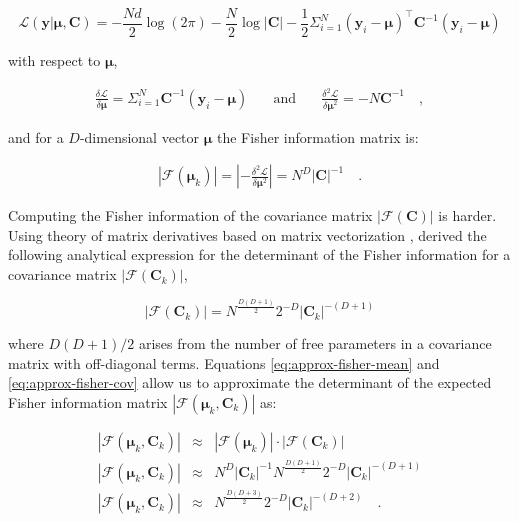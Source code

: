 \documentclass{aastex61}
\newcommand{\vect}[1]{\boldsymbol{\mathbf{#1}}}
\def\veccov{\vect{C}}
\def\vecmean{\vect{\mu}}
\def\datum{y}
\def\data{\vect{\datum}}
\def\likelihood{\mathcal{L}}
\begin{document}
\begin{equation}
  \likelihood\left(\data|\vecmean, \veccov\right) = 
  -\frac{Nd}{2}\log{\left(2\pi\right)} - \frac{N}{2}\log{|\veccov|} - \frac{1}{2}\Sigma_{i=1}^{N}\left(\data_i - \vecmean\right)^\intercal{}\veccov^{-1}\left(\bm{y}_i - \vecmean\right)
\end{equation}

\noindent{}with respect to $\vecmean$,

\begin{eqnarray}
  \frac{\delta\likelihood}{\delta\vecmean} = \Sigma_{i=1}^{N}\veccov^{-1}(\data_i - \vecmean)
  & \hspace{1em}\textrm{and}\hspace{1em}
  & \frac{\delta^2\likelihood}{\delta\vecmean^2} = -N\veccov^{-1} \quad ,
\end{eqnarray}

\noindent{}and for a $D$-dimensional vector $\vecmean$ the Fisher information
matrix is:

\begin{eqnarray}
  |\mathcal{F}(\vecmean_k)| = \left|-\frac{\delta^2\likelihood}{\delta\vecmean^2}\right| = N^D|\veccov|^{-1} \quad .
  \label{eq:approx-fisher-mean}
\end{eqnarray}

Computing the Fisher information of the covariance matrix 
$|\mathcal{F}\left(\veccov\right)|$ is harder.
Using theory of matrix derivatives based on matrix vectorization \citep{Dwyer_1967},
\citet{Magnus_1988} derived the following analytical expression for the 
determinant of the Fisher information for a covariance matrix
$|\mathcal{F}\left(\veccov_k\right)|$,


\begin{equation}
  |\mathcal{F}\left(\veccov_k\right)| = N^\frac{D(D+1)}{2}2^{-D}|\veccov_k|^{-(D+1)}
  \label{eq:approx-fisher-cov}
\end{equation}

\noindent{}where $D(D+1)/2$ arises from the number of free parameters in a
covariance matrix with off-diagonal terms.
Equations \ref{eq:approx-fisher-mean} and \ref{eq:approx-fisher-cov} allow us
to approximate the determinant of the expected Fisher information matrix
$|\mathcal{F}\left(\vecmean_k,\veccov_k\right)|$ as:

\begin{eqnarray}
  |\mathcal{F}\left(\vecmean_k,\veccov_k\right)| & \approx & |\mathcal{F}\left(\vecmean_k\right)|\cdot|\mathcal{F}\left(\veccov_k\right)| \nonumber \\
  |\mathcal{F}\left(\vecmean_k,\veccov_k\right)| & \approx & N^{D}|\veccov_k|^{-1}N^\frac{D(D+1)}{2}2^{-D}|\veccov_k|^{-(D+1)} \nonumber \\
  |\mathcal{F}\left(\vecmean_k,\veccov_k\right)| & \approx & N^\frac{D(D+3)}{2}2^{-D}|\veccov_k|^{-(D+2)} \quad .
  \label{eq:fisher-mean-cov}
\end{eqnarray}
\end{document}
